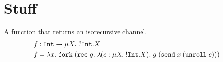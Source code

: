 
\section{Stuff}
\label{sec:stuff}

A function that returns an isorecursive channel.
\begin{align*}
  f &: \mathtt{Int} \rightarrow \mu X.\;{{}?\mathtt{Int}.X}
  \\
  f &= \lambda x.\; \mathtt{fork}\; (\mathtt{rec}\; g.\; \lambda (c: \mu X.\;{{}!\mathtt{Int}.X}).\; g\; (\mathtt{send}\; x \; (\mathtt{unroll}\; c)))
\end{align*}

